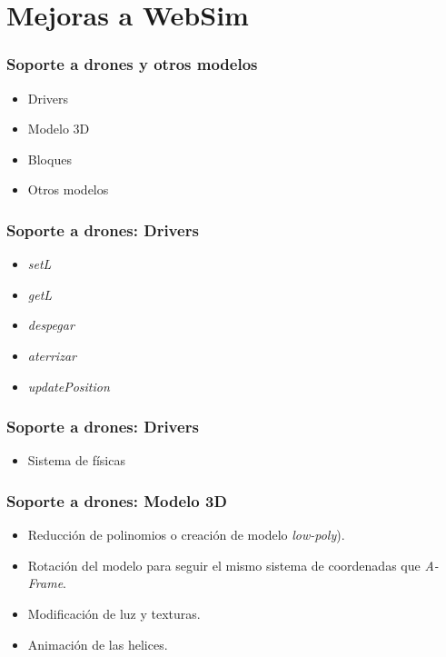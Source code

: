\documentclass[xcolor={table}]{beamer}
\begin{document}
	\section{Mejoras a WebSim}
		\begin{frame}
			\frametitle{Soporte a drones y otros modelos}
				\begin{itemize}
				\item Drivers
				\item Modelo 3D
				\item Bloques 
				\item Otros modelos 
			\end{itemize}
		\end{frame}
			\begin{frame}
			\frametitle{Soporte a drones: Drivers}
			\begin{itemize}
				\item \textit{setL}
				\item \textit{getL}
				\item \textit{despegar}
				\item \textit{aterrizar}
				\item \textit{updatePosition}
			\end{itemize}
		\end{frame}
			\begin{frame}
			\frametitle{Soporte a drones: Drivers}
			\begin{itemize}
				\item Sistema de físicas
			\end{itemize}
		\end{frame}
				
    	\begin{frame}
			\frametitle{Soporte a drones: Modelo 3D}
            \begin{itemize}
                \item Reducción de polinomios o creación de modelo \textit{low-poly}).
                \item Rotación del modelo para seguir el mismo sistema de coordenadas que \textit{A-Frame}.
                \item Modificación de luz y texturas. \item Animación de las helices. 
            \end{itemize}
    	\end{frame}
    	
\end{document}
